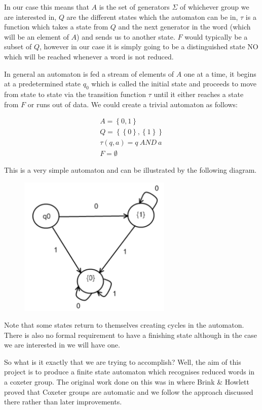 \documentclass[a4paper,12pt]{article}
\begin{document}
In our case this means that $A$ is the set of generators $\Sigma$ of whichever group we are interested in, $Q$ are the different states which the automaton can be in, $\tau$ is a function which takes a state from $Q$ and the next generator in the word (which will be an element of $A$) and sends us to another state. $F$ would typically be a subset of $Q$, however in our case it is simply going to be a distinguished state NO which will be reached whenever a word is not reduced.

In general an automaton is fed a stream of elements of $A$ one at a time, it begins at a predetermined state $q_0$ which is called the initial state and proceeds to move from state to state via the transition function $\tau$ until it either reaches a state from $F$ or runs out of data. We could create a trivial automaton as follows:

\begin{align*}
	A = \left\{0, 1\right\} \\
	Q = \left\{\left\{0\right\}, \left\{1\right\}\right\} \\
	\tau(q, a) = q \: AND \: a \\
	F = \emptyset
\end{align*}

This is a very simple automaton and can be illustrated by the following diagram.

\begin{figure}[H]
	\centering
		\includegraphics[width=73mm]{and_automaton.png}
	\label{fig:and_automaton}
\end{figure}

Note that some states return to themselves creating cycles in the automaton. There is also no formal requirement to have a finishing state although in the case we are interested in we will have one.

So what is it exactly that we are trying to accomplish? Well, the aim of this project is to produce a finite state automaton which recognises reduced words in a coxeter group. The original work done on this was in \cite{brinkhowlett93} where Brink \& Howlett proved that Coxeter groups are automatic and we follow the approach discussed there rather than later improvements.
\end{document}
